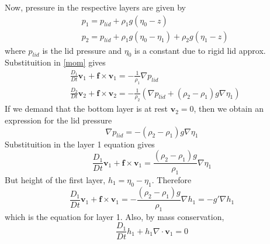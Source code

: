 \documentclass[12pt,twoside]{article}
\newcommand{\bs}  [1]{\boldsymbol{#1}}
\newcommand{\del} {\nabla}
\begin{document}
Now, pressure in the respective layers are given by
\begin{subequations}
\begin{align}
&p_1 = p_{lid} + \rho _1 g (\eta _0 -z) \\
&p_2 = p_{lid} + \rho _1 g (\eta _0 -\eta _1) + \rho _2 g (\eta _1 -z)
\end{align}
\end{subequations}
where $p_{lid}$ is the lid pressure and $\eta _0$ is a constant due to rigid lid approx.
Substituition in \eqref{mom} gives
\begin{subequations}
\label{mom1}
\begin{align}
&\frac{D_1 }{D t} \bs v_1 + \bs f \times \bs v_1 = -\frac{1}{\rho _1} \del p_{lid}  \\
&\frac{D_2 }{D t} \bs v_2 + \bs f \times \bs v_2 = -\frac{1}{\rho _2}  ( \del p_{lid} + (\rho _2 - \rho_1)g \del \eta_1 )
\end{align}
\end{subequations}
If we demand that the bottom layer is at rest $\bs v_2 = 0$, then we obtain an expression for the lid pressure
\begin{equation}
\label{lid}
\del p_{lid} = - (\rho _2 - \rho_1)g \del \eta_1
\end{equation}
Substituition in the layer 1 equation gives 
\begin{equation}
\frac{D_1 }{D t} \bs v_1 + \bs f \times \bs v_1 = \frac{(\rho _2 - \rho_1)g}{\rho _1} \del \eta_1
\end{equation}
But height of the first layer, $h_1 = \eta _0 - \eta _1$. Therefore
\begin{equation}
\frac{D_1 }{D t} \bs v_1 + \bs f \times \bs v_1 = - \frac{(\rho _2 - \rho_1)g}{\rho _1} \del h_1 = - g' \del h_1
\end{equation}
which is the equation for layer 1. Also, by mass conservation,
\begin{equation}
\frac{D_1 }{D t} h_1 + h_1 \del \cdot \bs v_1 = 0
\end{equation}



% 
\end{document}
